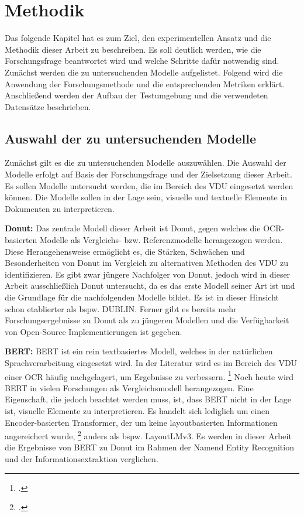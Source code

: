 \chapter{Methodik}
Das folgende Kapitel hat es zum Ziel, den experimentellen Ansatz und die Methodik dieser Arbeit zu beschreiben. Es soll deutlich werden, wie die Forschungsfrage beantwortet wird und welche Schritte dafür notwendig sind. Zunächst werden die zu untersuchenden Modelle aufgelistet. Folgend wird die Anwendung der Forschungsmethode und die entsprechenden Metriken erklärt. Anschließend werden der Aufbau der Testumgebung und die verwendeten Datensätze beschrieben. 
\section{Auswahl der zu untersuchenden Modelle}
Zunächst gilt es die zu untersuchenden Modelle auszuwählen. Die Auswahl der Modelle erfolgt auf Basis der Forschungsfrage und der Zielsetzung dieser Arbeit. Es sollen Modelle untersucht werden, die im Bereich des \ac{VDU} eingesetzt werden können. Die Modelle sollen in der Lage sein, visuelle und textuelle Elemente in Dokumenten zu interpretieren. 

\textbf{Donut:} Das zentrale Modell dieser Arbeit ist \ac{Donut}, gegen welches die OCR-basierten Modelle als Vergleichs- bzw. Referenzmodelle herangezogen werden. Diese Herangehensweise ermöglicht es, die Stärken, Schwächen und Besonderheiten von Donut im Vergleich zu alternativen Methoden des \ac{VDU} zu identifizieren. Es gibt zwar jüngere Nachfolger von \ac{Donut}, jedoch wird in dieser Arbeit ausschließlich Donut untersucht, da es das erste Modell seiner Art ist und die Grundlage für die nachfolgenden Modelle bildet. Es ist in dieser Hinsicht schon etablierter als bspw. \ac{DUBLIN}. Ferner gibt es bereits mehr Forschungsergebnisse zu \ac{Donut} als zu jüngeren Modellen und die Verfügbarkeit von Open-Source Implementierungen ist gegeben.

\textbf{BERT:} \ac{BERT} ist ein rein textbasiertes Modell, welches in der natürlichen Sprachverarbeitung eingesetzt wird. In der Literatur wird es im Bereich des \ac{VDU} einer OCR häufig nachgelagert, um Ergebnisse zu verbessern. \footcites[Vgl. dazu ausführlich][]{nguyen_neural_2020}[Vgl. dazu ausführlich][]{jiang_evaluating_2021} Noch heute wird \ac{BERT} in vielen Forschungen als Vergleichsmodell herangezogen. Eine Eigenschaft, die jedoch beachtet werden muss, ist, dass \ac{BERT} nicht in der Lage ist, visuelle Elemente zu interpretieren. Es handelt sich lediglich um einen Encoder-basierten Transformer, der um keine layoutbasierten Informationen angereichert wurde, \footcites[Vgl. dazu ausführlich][]{devlin_bert_2018} anders als bspw. LayoutLMv3. Es werden in dieser Arbeit die Ergebnisse von \ac{BERT} zu \ac{Donut} im Rahmen der Namend Entity Recognition und der Informationsextraktion verglichen.

